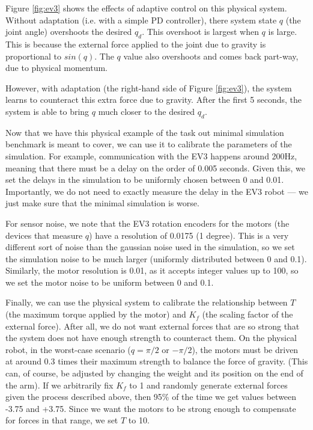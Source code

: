 \documentclass{frontiersSCNS} %
\begin{document}
Figure \ref{fig:ev3} shows the effects of adaptive control on this physical
system.  Without adaptation (i.e. with a simple PD controller), there system
state $q$ (the joint angle) overshoots the desired $q_d$.  This overshoot
is largest when $q$ is large.  This is because the external force applied to
the joint due to gravity is proportional to $sin(q)$.  The $q$ value also
overshoots and comes back part-way, due to physical momentum.

However, with adaptation (the right-hand side of Figure \ref{fig:ev3}),
the system learns to counteract this extra force due to gravity.  After
the first 5 seconds, the system is able to bring $q$ much closer to the
desired $q_d$.

Now that we have this physical example of the task out minimal simulation
benchmark is meant to cover, we can use it to calibrate the parameters of
the simulation.  For example, communication with the EV3 happens around
200Hz, meaning that there must be a delay on the order of 0.005 seconds.  Given
this, we set the delays in the simulation to be uniformly chosen between
0 and 0.01.  Importantly, we do not need to exactly measure the delay in the
EV3 robot --- we just make sure that the minimal simulation is worse.

For sensor noise, we note that the EV3 rotation encoders for the motors (the
devices that measure $q$) have a resolution of 0.0175 (1 degree).  This is a
very different sort of noise than the gaussian noise used in the simulation,
so we set the simulation noise to be much larger (uniformly distributed
between 0 and 0.1).  Similarly, the motor resolution is 0.01, as it accepts 
integer values up to 100, so we set the motor noise to be uniform between
0 and 0.1.

Finally, we can use the physical system to calibrate the relationship between
$T$ (the maximum torque applied by the motor) and $K_f$ (the scaling factor
of the external force).  After all, we do not want external forces that are
so strong that the system does not have enough strength to counteract them.
On the physical robot, in the worst-case scenario ($q=\pi/2$ or $-\pi/2$),
the motors must be driven at around 0.3 times their maximum strength to
balance the force of gravity.  (This can, of course, be adjusted by changing
the weight and its position on the end of the arm).  If we arbitrarily fix $K_f$ to 1 and randomly
generate external forces given the process described above, then 95\% of
the time we get values between -3.75 and +3.75.  Since we want the motors to
be strong enough to compensate for forces in that range, we set $T$ to 10.
\end{document}
